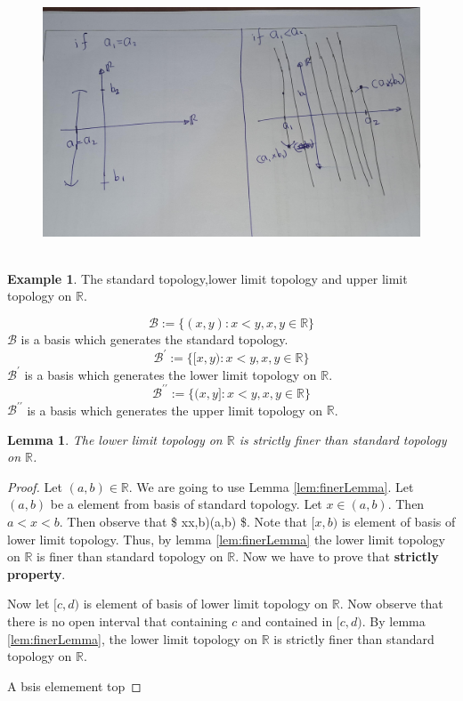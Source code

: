 \documentclass[
]{book}
\newtheorem{lemma}{Lemma}[chapter]
\theoremstyle{definition}
\theoremstyle{definition}
\newtheorem{example}{Example}[chapter]
\theoremstyle{definition}
\theoremstyle{definition}
\theoremstyle{remark}
\begin{document}
\begin{figure}
\centering
\includegraphics{figures/figure 07.jpg}
\caption{\label{fig:fi7}\(~\)}
\end{figure}

\begin{example}
\protect\hypertarget{exm:unnamed-chunk-30}{}\label{exm:unnamed-chunk-30}The standard topology,lower limit topology and upper limit topology on \(\mathbb{R}\).

\[\mathcal{B}:=\{(x,y):x<y, x,y\in \mathbb{R}\}\]
\(\mathcal{B}\) is a basis which generates the standard topology.
\[\mathcal{B}^\prime:=\{[x,y):x<y, x,y\in \mathbb{R}\}\]
\(\mathcal{B}^\prime\) is a basis which generates the lower limit topology on \(\mathbb{R}\).
\[\mathcal{B}^{\prime\prime}:=\{(x,y]:x<y, x,y\in \mathbb{R}\}\]
\(\mathcal{B}^{\prime\prime}\) is a basis which generates the upper limit topology on \(\mathbb{R}\).
\end{example}

\begin{lemma}
\protect\hypertarget{lem:unnamed-chunk-31}{}\label{lem:unnamed-chunk-31}The lower limit topology on \(\mathbb{R}\) is strictly finer than standard topology on \(\mathbb{R}\).
\end{lemma}

\begin{proof}
Let \((a,b)\in \mathbb{R}\). We are going to use Lemma \ref{lem:finerLemma}. Let \((a,b)\) be a element from basis of standard topology. Let \(x\in (a,b)\). Then \(a<x<b\). Then observe that \$ x\in {[}x,b)\subset (a,b) \$. Note that \([x,b)\) is element of basis of lower limit topology. Thus, by lemma \ref{lem:finerLemma} the lower limit topology on \(\mathbb{R}\) is finer than standard topology on \(\mathbb{R}\). Now we have to prove that \textbf{strictly property}.

Now let \([c,d)\) is element of basis of lower limit topology on \(\mathbb{R}\). Now observe that there is no open interval that containing \(c\) and contained in \([c,d)\). By lemma \ref{lem:finerLemma}, the lower limit topology on \(\mathbb{R}\) is strictly finer than standard topology on \(\mathbb{R}\).

A bsis elemement top
\end{proof}
\end{document}
